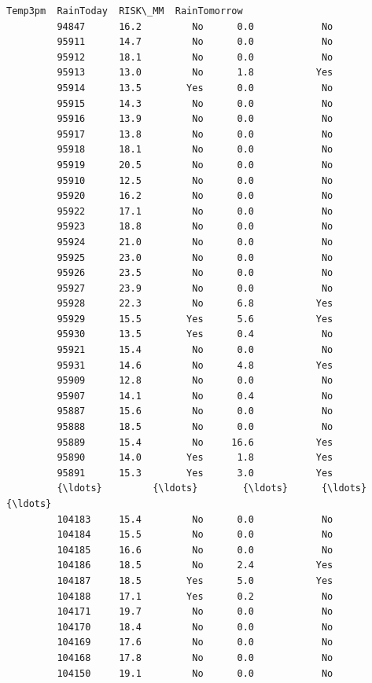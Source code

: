 \documentclass[11pt]{article}
\begin{document}
\begin{Verbatim}[commandchars=\\\{\}]
                 Temp3pm  RainToday  RISK\_MM  RainTomorrow  
         94847      16.2         No      0.0            No  
         95911      14.7         No      0.0            No  
         95912      18.1         No      0.0            No  
         95913      13.0         No      1.8           Yes  
         95914      13.5        Yes      0.0            No  
         95915      14.3         No      0.0            No  
         95916      13.9         No      0.0            No  
         95917      13.8         No      0.0            No  
         95918      18.1         No      0.0            No  
         95919      20.5         No      0.0            No  
         95910      12.5         No      0.0            No  
         95920      16.2         No      0.0            No  
         95922      17.1         No      0.0            No  
         95923      18.8         No      0.0            No  
         95924      21.0         No      0.0            No  
         95925      23.0         No      0.0            No  
         95926      23.5         No      0.0            No  
         95927      23.9         No      0.0            No  
         95928      22.3         No      6.8           Yes  
         95929      15.5        Yes      5.6           Yes  
         95930      13.5        Yes      0.4            No  
         95921      15.4         No      0.0            No  
         95931      14.6         No      4.8           Yes  
         95909      12.8         No      0.0            No  
         95907      14.1         No      0.4            No  
         95887      15.6         No      0.0            No  
         95888      18.5         No      0.0            No  
         95889      15.4         No     16.6           Yes  
         95890      14.0        Yes      1.8           Yes  
         95891      15.3        Yes      3.0           Yes  
         {\ldots}         {\ldots}        {\ldots}      {\ldots}           {\ldots}  
         104183     15.4         No      0.0            No  
         104184     15.5         No      0.0            No  
         104185     16.6         No      0.0            No  
         104186     18.5         No      2.4           Yes  
         104187     18.5        Yes      5.0           Yes  
         104188     17.1        Yes      0.2            No  
         104171     19.7         No      0.0            No  
         104170     18.4         No      0.0            No  
         104169     17.6         No      0.0            No  
         104168     17.8         No      0.0            No  
         104150     19.1         No      0.0            No  

\end{Verbatim}
\end{document}

